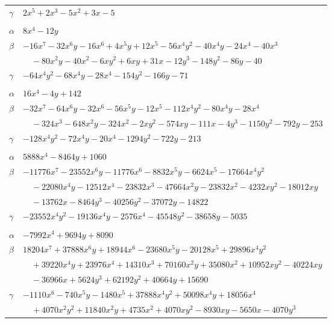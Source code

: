 \documentclass[11pt]{article}
\begin{document}
\begin{longtable}{@{}ll@{}}
$\gamma$ & $2x^{5}+2x^{3}-5x^{2}+3x-5$\\
\addlinespace[3pt]
\multicolumn{2}{@{}l}{$\{i,j\}=\{3,8\}$, $k_{ij}=2^{3}\cdot 5$}\\
$\alpha$ & $8x^{4}-12y$\\
$\beta$ & $-16x^{7}-32x^{6}y-16x^{6}+4x^{5}y+12x^{5}-56x^{4}y^{2}-40x^{4}y-24x^{4}-40x^{3}$\\
 & $\quad -80x^{2}y-40x^{2}-6xy^{2}+6xy+31x-12y^{3}-148y^{2}-86y-40$\\
$\gamma$ & $-64x^{4}y^{2}-68x^{4}y-28x^{4}-154y^{2}-166y-71$\\
\addlinespace[3pt]
\multicolumn{2}{@{}l}{$\{i,j\}=\{3,9\}$, $k_{ij}=2^{2}\cdot 3^{4}$}\\
$\alpha$ & $16x^{4}-4y+142$\\
$\beta$ & $-32x^{7}-64x^{6}y-32x^{6}-56x^{5}y-12x^{5}-112x^{4}y^{2}-80x^{4}y-28x^{4}$\\
 & $\quad -324x^{3}-648x^{2}y-324x^{2}-2xy^{2}-574xy-111x-4y^{3}-1150y^{2}-792y-253$\\
$\gamma$ & $-128x^{4}y^{2}-72x^{4}y-20x^{4}-1294y^{2}-722y-213$\\
\addlinespace[3pt]
\multicolumn{2}{@{}l}{$\{i,j\}=\{3,31\}$, $k_{ij}=3^{5}\cdot 7^{2}$}\\
$\alpha$ & $5888x^{4}-8464y+1060$\\
$\beta$ & $-11776x^{7}-23552x^{6}y-11776x^{6}-8832x^{5}y-6624x^{5}-17664x^{4}y^{2}$\\
 & $\quad -22080x^{4}y-12512x^{4}-23832x^{3}-47664x^{2}y-23832x^{2}-4232xy^{2}-18012xy$\\
 & $\quad -13762x-8464y^{3}-40256y^{2}-37072y-14822$\\
$\gamma$ & $-23552x^{4}y^{2}-19136x^{4}y-2576x^{4}-45548y^{2}-38658y-5035$\\
\addlinespace[3pt]
\multicolumn{2}{@{}l}{$\{i,j\}=\{3,32\}$, $k_{ij}=2\cdot 5\cdot 7^{2}$}\\
$\alpha$ & $-7992x^{4}+9694y+8090$\\
$\beta$ & $18204x^{7}+37888x^{6}y+18944x^{6}-23680x^{5}y-20128x^{5}+29896x^{4}y^{2}$\\
 & $\quad +39220x^{4}y+23976x^{4}+14310x^{3}+70160x^{2}y+35080x^{2}+10952xy^{2}-40224xy$\\
 & $\quad -36966x+5624y^{3}+62192y^{2}+40664y+15690$\\
$\gamma$ & $-1110x^{6}-740x^{5}y-1480x^{5}+37888x^{4}y^{2}+50098x^{4}y+18056x^{4}$\\
 & $\quad +4070x^{2}y^{2}+11840x^{2}y+4735x^{2}+4070xy^{2}-8930xy-5650x-4070y^{3}$\\

\end{longtable}
\end{document}
